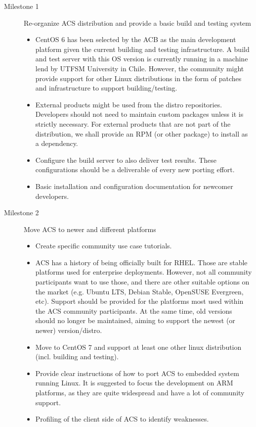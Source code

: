 \documentclass[letterpaper,11pt,twosided]{article}
\begin{document}
\begin{description}
\item[Milestone 1] Re-organize ACS distribution and provide a basic build and testing system \hfill
\begin{itemize}
\item CentOS 6 has been selected by the ACB as the main development platform given the current building and testing infrastructure. A build and test server with this OS version is currently running in a machine lend by UTFSM University in Chile. However, the community might provide support for other Linux distributions in the form of patches and infrastructure to support building/testing.
\item External products might be used from the distro repositories. Developers should not need to maintain custom packages unless it is strictly necessary. For external products that are not part of the distribution, we shall provide an RPM (or other package) to install as a dependency.
\item Configure the build server to also deliver test results. These configurations should be a deliverable of every new porting effort.
\item Basic installation and configuration documentation for newcomer developers.
\end{itemize}

\item[Milestone 2] Move ACS to newer and different platforms \hfill
\begin{itemize}
\item Create specific community use case tutorials.
\item ACS has a history of being officially built for RHEL. Those are stable platforms used for enterprise deployments. However, not all community participants want to use those, and there are other suitable options on the market (e.g. Ubuntu LTS, Debian Stable, OpenSUSE Evergreen, etc). Support should be provided for the platforms most used within the ACS community participants. At the same time, old versions should no longer be maintained, aiming to support the newest (or newer) version/distro.
\item Move to CentOS 7 and support at least one other linux distribution (incl. building and testing).
\item Provide clear instructions of how to port ACS to embedded system running Linux. It is suggested to focus the development on ARM platforms, as they are quite widespread and have a lot of community support.
\item Profiling of the client side of ACS to identify weaknesses.
\end{itemize}


\end{description}
\end{document}
